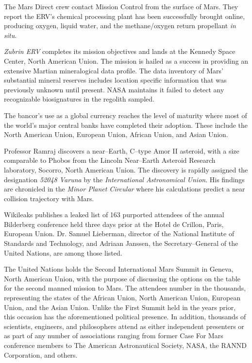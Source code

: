 The Mars Direct crew contact Mission Control from the surface of Mars. They report the ERV's chemical processing plant has been successfully brought online, producing oxygen, liquid water, and the methane/oxygen return propellant {\it in situ}.
\StopTimelineDate

{\it Zubrin ERV} completes its mission objectives and lands at the Kennedy Space Center, North American Union. The mission is hailed as a success in providing an extensive Martian mineralogical data profile. The data inventory of Mars' substantial mineral reserves includes location specific information that was previously unknown until present. NASA maintains it failed to detect any recognizable biosignatures in the regolith sampled.
\StopTimelineDate

The bancor's use as a global currency reaches the level of maturity where most of the world's major central banks have completed their adoption. These include the North American Union, European Union, African Union, and Asian Union.
\StopTimelineDate

Professor Ramraj discovers a near--Earth, C--type Amor II asteroid, with a size comparable to Phobos from the Lincoln Near--Earth Asteroid Research laboratory, Socorro, North American Union. The discovery is rapidly assigned the designation {\it 52048 Varuna} by the {\it International Astronomical Union}. His findings are chronicled in the {\it Minor Planet Circular} where his calculations predict a near collision trajectory with Mars.
\StopTimelineDate

Wikileaks publishes a leaked list of 163 purported attendees of the annual Bilderberg conference held three days prior at the Hotel de Crillon, Paris, European Union. Dr. Samuel Lieberman, director of the National Institute of Standards and Technology, and Adriaan Janssen, the Secretary--General of the United Nations, are among those listed.
\StopTimelineDate

The United Nations holds the Second International Mars Summit in Geneva, North American Union, with the purpose of discussing the options on the table for the second manned mission to Mars. The attendees number in the thousands, representing the states of the African Union, North American Union, European Union, and the Asian Union. Unlike the First Summit held in the years prior, this occasion has the aforementioned political presence. In addition, thousands of scientists, engineers, and philosophers attend as either independent presenters or as part of any number of associations ranging from former Case For Mars conference members to The American Astronautical Society, NASA, the RANND Corporation, and others.

